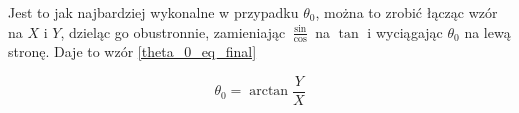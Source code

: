 Jest to jak najbardziej wykonalne w przypadku $\theta_0$, można to zrobić łącząc wzór na $X$ i $Y$, dzieląc go obustronnie, zamieniając $\frac{\sin}{\cos}$ na $\tan$ i wyciągając $\theta_0$ na lewą stronę. Daje to wzór \ref{theta_0_eq_final}





\begin{equation} \label{theta_0_eq_final}
\theta_0 = \arctan{\frac{Y}{X}}
\end{equation}








